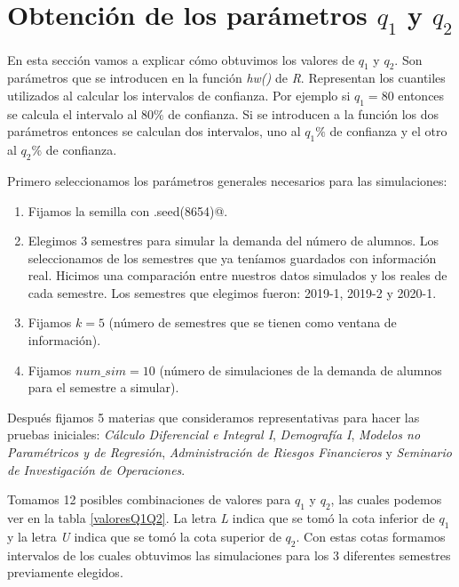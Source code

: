 \section{Obtención de los parámetros $q_{1}$ y $q_{2}$}

En esta sección vamos a explicar cómo obtuvimos los valores de $q_{1}$ y $q_{2}$. Son parámetros que se introducen en la función \textit{hw()} de \textit{R}. Representan los cuantiles utilizados al calcular los intervalos de confianza. Por ejemplo si $q_{1} = 80$ entonces se calcula el intervalo al $80\%$ de confianza. Si se introducen a la función los dos parámetros entonces se calculan dos intervalos, uno al $q_{1}\%$ de confianza y el otro al $q_{2}\%$ de confianza.

Primero seleccionamos los parámetros generales necesarios para las simulaciones:

\begin{enumerate}
\item Fijamos la semilla con \verb@set.seed(8654)@.

\item Elegimos 3 semestres para simular la demanda del número de alumnos. Los seleccionamos de los semestres que ya teníamos guardados con información real. Hicimos una comparación entre nuestros datos simulados y los reales de cada semestre. Los semestres que elegimos fueron: 2019-1, 2019-2 y 2020-1.

\item Fijamos $k = 5$ (número de semestres que se tienen como ventana de información).

\item Fijamos $num\_sim = 10$ (número de simulaciones de la demanda de alumnos para el semestre a simular).
\end{enumerate}


Después fijamos 5 materias que consideramos representativas para hacer las pruebas iniciales: \textit{Cálculo Diferencial e Integral I}, \textit{Demografía I}, \textit{Modelos no Paramétricos y de Regresión}, \textit{Administración de Riesgos Financieros} y \textit{Seminario de Investigación de Operaciones}.

Tomamos 12 posibles combinaciones de valores para $q_{1}$ y $q_{2}$, las cuales podemos ver en la tabla \ref{valoresQ1Q2}. La letra \textit{L} indica que se tomó la cota inferior de $q_{1}$ y la letra \textit{U} indica que se tomó la cota superior de $q_{2}$. Con estas cotas formamos intervalos de los cuales obtuvimos las simulaciones para los 3 diferentes semestres previamente elegidos. %

